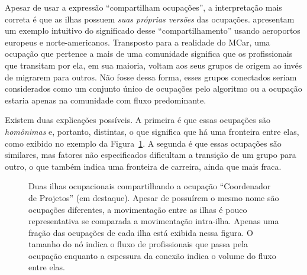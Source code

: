 \documentclass[12pt,a4paper]{article}
\begin{document}
Apesar de usar a expressão \enquote{compartilham ocupações}, a interpretação mais correta é que as ilhas possuem \textit{suas próprias versões} das ocupações.  apresentam um exemplo intuitivo do significado desse \enquote{compartilhamento} usando aeroportos europeus e norte-americanos. Transposto para a realidade do MCar, uma ocupação que pertence a mais de uma comunidade significa que os profissionais que transitam por ela, em sua maioria, voltam aos seus grupos de origem ao invés de migrarem para outros. Não fosse dessa forma, esses grupos conectados seriam considerados como um conjunto único de ocupações pelo algoritmo ou a ocupação estaria apenas na comunidade com fluxo predominante.

Existem duas explicações possíveis. A primeira é que essas ocupações são \textit{homônimas} e, portanto, distintas, o que significa que há uma fronteira entre elas, como exibido no exemplo da Figura~\ref{fig:homonimos}. A segunda é que essas ocupações são similares, mas fatores não especificados dificultam a transição de um grupo para outro, o que também indica uma fronteira de carreira, ainda que mais fraca.

\begin{figure}[htb]
    \centering
    \caption{Duas ilhas ocupacionais compartilhando a ocupação \enquote{Coordenador de Projetos} (em destaque). Apesar de possuírem o mesmo nome são ocupações diferentes, a movimentação entre as ilhas é pouco representativa se comparada a movimentação intra-ilha. Apenas uma fração das ocupações de cada ilha está exibida nessa figura. O tamanho do nó indica o fluxo de profissionais que passa pela ocupação enquanto a espessura da conexão indica o volume do fluxo entre elas.}
    \label{fig:homonimos}
\end{figure}
\end{document}
